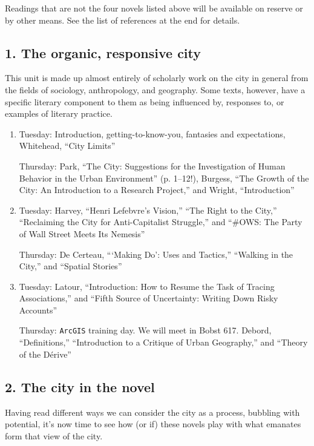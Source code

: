 Readings that are not the four novels listed above will be available on reserve
or by other means. See the list of references at the end for details.

\subsection*{1. The organic, responsive city}

  This unit is made up almost entirely of scholarly work on the city in general
  from the fields of sociology, anthropology, and geography. Some texts,
  however, have a specific literary component to them as being influenced by,
  responses to, or examples of literary practice. 

\begin{enumerate}

  \item Tuesday: Introduction, getting-to-know-you, fantasies and expectations,
    Whitehead, “City Limits”

    Thursday: Park, “The City: Suggestions for the Investigation of Human Behavior in the Urban Environment” (p. 1--12!), Burgess, “The Growth of the City: An Introduction to a Research Project,” and Wright, “Introduction”

  \item Tuesday: Harvey, “Henri Lefebvre’s Vision,” “The Right to the City,” “Reclaiming the City for Anti-Capitalist Struggle,” and “\#OWS: The Party of Wall Street Meets Its Nemesis”

    Thursday: De Certeau, “‘Making Do’: Uses and Tactics,” “Walking in the City,” and “Spatial Stories”

  \item Tuesday: Latour, “Introduction: How to Resume the Task of Tracing Associations,” and “Fifth Source of Uncertainty: Writing Down Risky Accounts”

    Thursday: \texttt{ArcGIS} training day. We will meet in Bobst 617. Debord, “Definitions,” “Introduction to a Critique of Urban Geography,” and “Theory of the Dérive”

\end{enumerate}

\subsection*{2. The city in the novel}

Having read different ways we can consider the city as a process, bubbling with
potential, it’s now time to see how (or if) these novels play with what
emanates form that view of the city.


